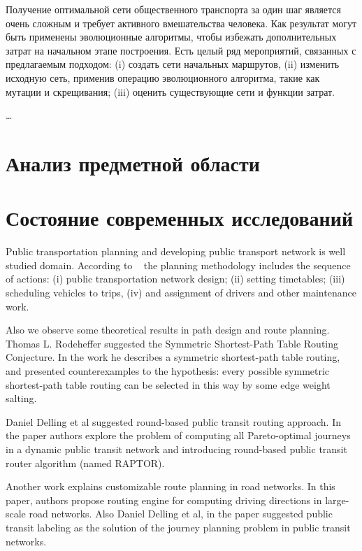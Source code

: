 Получение оптимальной сети общественного транспорта за один шаг является очень сложным и требует активного 
вмешательства человека. Как результат могут быть применены эволюционные алгоритмы, чтобы избежать дополнительных 
затрат на начальном этапе построения. Есть целый ряд мероприятий, связанных с предлагаемым подходом: (i) 
создать сети начальных маршрутов, (ii) изменить исходную сеть, применив операцию эволюционного алгоритма, 
такие как мутации и скрещивания; (iii) оценить существующие сети и функции затрат.

\ldots

\section{Анализ предметной области}

\section{Состояние современных исследований}
Public transportation planning and developing public transport network is well studied domain. 
According to ~\cite{ceder2007} the planning methodology includes the sequence of actions: 
(i) public transportation network design; (ii) setting timetables; (iii) scheduling vehicles 
to trips, (iv) and assignment of drivers and other maintenance work. 

Also we observe some theoretical results in path design and route planning. Thomas L. Rodeheffer 
suggested the Symmetric Shortest-Path Table Routing Conjecture. In the work 
\cite{rodeheffer2013symmetric} he describes a symmetric shortest-path table routing, and presented 
counterexamples to the hypothesis: every possible symmetric shortest-path table routing can be 
selected in this way by some edge weight salting.

Daniel Delling et al suggested round-based public transit routing approach. In the paper 
\cite{delling2014round} authors explore the problem of computing all Pareto-optimal journeys in a 
dynamic public transit network and introducing round-based public transit router algorithm (named RAPTOR).

Another work \cite{delling2015customizable} explains customizable route planning in road networks. In 
this paper, authors propose routing engine for computing driving directions in large-scale road networks. 
Also Daniel Delling et al, in the paper \cite{delling2015public} suggested public transit labeling as the 
solution of the journey planning problem in public transit networks. 

